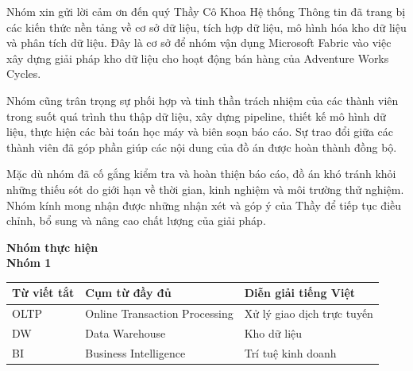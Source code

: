 Nhóm xin gửi lời cảm ơn đến quý Thầy Cô Khoa Hệ thống Thông tin đã trang bị các kiến thức nền tảng về cơ sở dữ liệu, tích hợp dữ liệu, mô hình hóa kho dữ liệu và phân tích dữ liệu. Đây là cơ sở để nhóm vận dụng Microsoft Fabric vào việc xây dựng giải pháp kho dữ liệu cho hoạt động bán hàng của Adventure Works Cycles.

Nhóm cũng trân trọng sự phối hợp và tinh thần trách nhiệm của các thành viên trong suốt quá trình thu thập dữ liệu, xây dựng pipeline, thiết kế mô hình dữ liệu, thực hiện các bài toán học máy và biên soạn báo cáo. Sự trao đổi giữa các thành viên đã góp phần giúp các nội dung của đồ án được hoàn thành đồng bộ.

Mặc dù nhóm đã cố gắng kiểm tra và hoàn thiện báo cáo, đồ án khó tránh khỏi những thiếu sót do giới hạn về thời gian, kinh nghiệm và môi trường thử nghiệm. Nhóm kính mong nhận được những nhận xét và góp ý của Thầy để tiếp tục điều chỉnh, bổ sung và nâng cao chất lượng của giải pháp.

\begin{flushright}
\textbf{Nhóm thực hiện}\\
\textbf{Nhóm 1}
\end{flushright}

\clearpage
{}
{\setlength{\parskip}{0pt}\tableofcontents}

\clearpage
{}
{\setlength{\parskip}{0pt}\renewcommand{\numberline}[1]{Hình #1: }\listoffigures}

\clearpage
{}
{\setlength{\parskip}{0pt}\renewcommand{\numberline}[1]{Bảng #1: }\listoftables}

{\singlespacing\renewcommand{\arraystretch}{1.5}
\begin{longtable}{|>{\centering\arraybackslash}p{2.2cm}|>{\centering\arraybackslash}p{6.1cm}|>{\centering\arraybackslash}p{6.1cm}|}\hline
\textbf{Từ viết tắt} & \textbf{Cụm từ đầy đủ} & \textbf{Diễn giải tiếng Việt} \\ \hline
\endhead
OLTP & Online Transaction Processing & Xử lý giao dịch trực tuyến \\ \hline
DW & Data Warehouse & Kho dữ liệu \\ \hline
BI & Business Intelligence & Trí tuệ kinh doanh \\ \hline
\end{longtable}}


